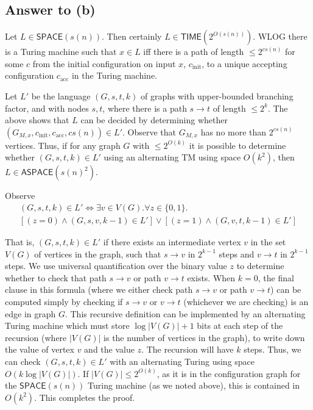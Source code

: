 \documentclass{article}
\newcommand{\TIME}{\mathbf{TIME}}
\def \ASPACE{{\mathsf{ASPACE}}}
\def \SPACE{{\mathsf{SPACE}}}
\def \TIME{{\mathsf{TIME}}}
\begin{document}

\subsection*{Answer to (b)}

Let $L \in \SPACE(s(n))$.  Then certainly $L \in \TIME(2^{O(s(n))})$.
WLOG there is a Turing machine such that $x \in L$ iff there is a path of length $\leq 2^{c s(n)}$ for some $c$ from the initial configuration on input $x$, $c_\text{init}$, to a unique accepting configuration $c_\text{acc}$ in the Turing machine.

Let $L'$ be the language $(G, s, t, k)$ of graphs with upper-bounded branching factor, and with nodes $s, t$, where there is a path $s \to t$ of length $\leq 2^k$.  The above shows that $L$ can be decided by determining whether $(G_{M, x}, c_\text{init}, c_\text{acc}, c s(n)) \in L'$.  Observe that $G_{M, x}$ has no more than $2^{c s(n)}$ vertices.  Thus, if for any graph $G$ with $\leq 2^{O(k)}$ it is possible to determine whether $(G, s, t, k) \in L'$ using an alternating TM using space $O(k^2)$, then $L \in \ASPACE(s(n)^2)$.

Observe
\begin{multline*}
(G, s, t, k) \in L' \iff
\exists v \in V(G) .
\forall z \in \{0, 1\} . \\
[(z = 0) \wedge (G, s, v, k - 1) \in L'] \vee
[(z = 1) \wedge (G, v, t, k - 1) \in L']
\end{multline*}

That is, $(G, s, t, k) \in L'$ if there exists an intermediate vertex $v$ in the set $V(G)$ of vertices in the graph, such that $s \to v$ in $2^{k - 1}$ steps and $v \to t$ in $2^{k - 1}$ steps.  We use universal quantification over the binary value $z$ to determine whether to check that path $s \to v$ or path $v \to t$ exists.
When $k = 0$, the final clause in this formula (where we either check path $s \to v$ or path $v \to t$) can be computed simply by checking if $s \to v$ or $v \to t$ (whichever we are checking) is an edge in graph $G$.
This recursive definition can be implemented by an alternating Turing machine which must store $\log |V(G)| + 1$ bits at each step of the recursion (where $|V(G)|$ is the number of vertices in the graph), to write down the value of vertex $v$ and the value $z$.  The recursion will have $k$ steps.  Thus, we can check $(G, s, t, k) \in L'$ with an alternating Turing using space $O(k \log |V(G)|)$.  If $|V(G)| \leq 2^{O(k)}$, as it is in the configuration graph for the $\SPACE(s(n))$ Turing machine (as we noted above), this is contained in $O(k^2)$.  This completes the proof. 
\end{document}
